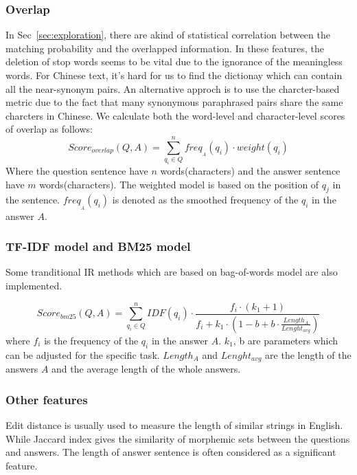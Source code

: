 \documentclass{llncs}
\begin{document}
\subsubsection{Overlap}
In Sec~\ref{sec:exploration}, there are a{\color{red}kind of} statistical correlation between the matching probability and the overlapped information. 
In these features, the {\color{red}deletion} of stop words seems to be vital due to the ignorance of the meaningless words. For Chinese text, it's hard for us to find the dictionay which can contain all the near-synonym pairs. An alternative approch is to use the charcter-based metric due to the fact that many synonymous paraphrased pairs share the same {\color{red}charcters in Chinese}. We calculate both the word-level and character-level scores of overlap as follows:
\begin{equation}
Score_{overlap}(Q,A)=\sum_{q_i \in Q}^n freq_{_A}(q_i)\cdot weight(q_i)  
\label{eq:overlap}
\end{equation}
Where the question sentence have $n$ words(characters) and the answer sentence have $m$ words(characters). The weighted model is based on the position of $q_j$ in the sentence. %
$freq_{_A}(q_i)$ is denoted as the smoothed frequency of the $q_i$ in the answer $A$.
\subsubsection{TF-IDF model and BM25 model}
Some tranditional IR methods which are based on bag-of-words model are also implemented.

\begin{equation}
Score_{bm25}(Q,A)=\sum_{q_i \in Q}^nIDF(q_i)\cdot \frac{f_i\cdot(k_1+1)}{f_i + k_1 \cdot (1-b +b\cdot \frac{Length_A}{Lenght_{avg}})}  
\label{eq:bm25}
\end{equation}
where $f_i$ is the frequency of the $q_i$ in the answer $A$. $k_1$, b are parameters which can be {\color{red}adjusted} for the specific task. $Length_A$ and $Lenght_{avg}$ are the length of the answers $A$ and the average length of the whole answers.

\subsubsection{Other features}
Edit distance is usually used to measure the length of similar strings in English. While Jaccard index gives the similarity of morphemic sets between the questions and answers. The length of answer sentence is often considered as a significant feature.
\end{document}
